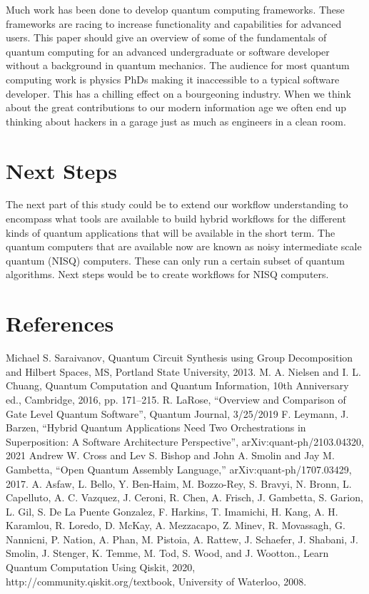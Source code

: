 \documentclass{article}
\begin{document}
Much work has been done to develop quantum computing frameworks. These frameworks are racing to increase functionality and capabilities for advanced users. This paper should give an overview of some of the fundamentals of quantum computing for an advanced undergraduate or software developer without a background in quantum mechanics. The audience for most quantum computing work is physics PhDs making it inaccessible to a typical software developer. This has a chilling effect on a bourgeoning industry. When we think about the great contributions to our modern information age we often end up thinking about hackers in a garage just as much as engineers in a clean room.

\section{Next Steps}

The next part of this study could be to extend our workflow understanding to encompass what tools are available to build hybrid workflows for the different kinds of quantum applications that will be available in the short term. The quantum computers that are available now are known as noisy intermediate scale quantum (NISQ) computers. These can only run a certain subset of quantum algorithms. Next steps would be to create workflows for NISQ computers.

\section{References}
\begin{thebibliography}{00}
    \makeatletter
    \makeatother
     Michael S. Saraivanov, Quantum Circuit Synthesis using Group Decomposition and Hilbert Spaces, MS, Portland State University, 2013.
     M. A. Nielsen and I. L. Chuang, Quantum Computation and Quantum Information, 10th Anniversary ed., Cambridge, 2016, pp. 171--215.
     R. LaRose, ``Overview and Comparison of Gate Level Quantum Software'', Quantum Journal, 3/25/2019
     F. Leymann, J. Barzen, ``Hybrid Quantum Applications Need Two Orchestrations in Superposition: A Software Architecture Perspective'', arXiv:quant-ph/2103.04320, 2021
     Andrew W. Cross and Lev S. Bishop and John A. Smolin and Jay M. Gambetta, ``Open Quantum Assembly Language,'' arXiv:quant-ph/1707.03429, 2017.      
     A. Asfaw, L. Bello, Y. Ben-Haim, M. Bozzo-Rey, S. Bravyi, N. Bronn, L. Capelluto, A. C. Vazquez, J. Ceroni, R. Chen, A. Frisch, J. Gambetta, S. Garion, L. Gil, S. De La Puente Gonzalez, F. Harkins, T. Imamichi, H. Kang, A. H. Karamlou, R. Loredo, D. McKay, A. Mezzacapo, Z. Minev, R. Movassagh, G. Nannicni, P. Nation, A. Phan, M. Pistoia, A. Rattew, J. Schaefer, J. Shabani, J. Smolin, J. Stenger, K. Temme, M. Tod, S. Wood, and J. Wootton., Learn Quantum Computation Using Qiskit, 2020, {http://community.qiskit.org/textbook}, University of Waterloo, 2008.
\end{thebibliography}
\end{document}
